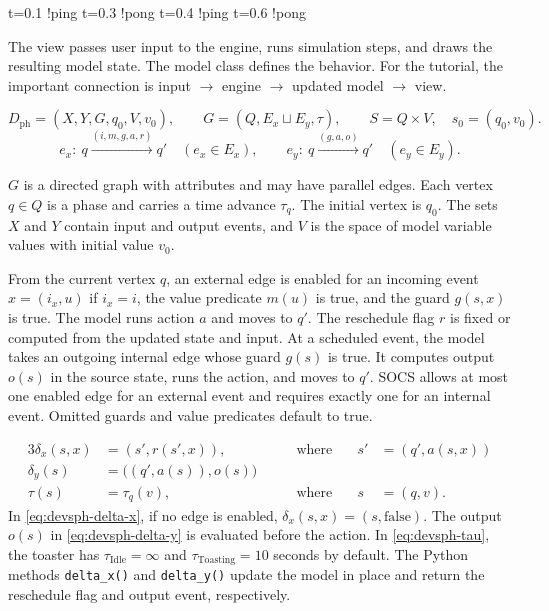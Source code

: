 \documentclass[11pt,a4paper]{article}
\newcommand{\api}[1]{\texttt{#1}}
\newcommand{\chaptermark}[1]{\par\noindent{\LARGE\color{ink}\bfseries #1}\par\smallskip}
\newcommand{\topic}[1]{\par\medskip{\large\color{accent}\bfseries #1}\par}
\begin{document}
\begin{Code}
t=0.1  !ping
t=0.3  !pong
t=0.4  !ping
t=0.6  !pong
\end{Code}
\topic{What the live view does}
The view passes user input to the engine, runs simulation steps, and
draws the resulting model state. The model class defines the behavior.
For the tutorial, the important connection is input $\to$ engine
$\to$ updated model $\to$ view.

\newpage
\chaptermark{2.2 \enspace DEVSph}
\begin{equation}\label{eq:devsph}
D_{\mathrm{ph}}=(X,Y,G,q_0,V,v_0),
\qquad G=(Q,E_x\sqcup E_y,\tau),
\qquad S=Q\times V,\quad s_0=(q_0,v_0).
\end{equation}
\begin{equation}\label{eq:devsph-edges}
e_x:\ q\xrightarrow{(i,m,g,a,r)}q'\quad(e_x\in E_x),
\qquad
e_y:\ q\xrightarrow{(g,a,o)}q'\quad(e_y\in E_y).
\end{equation}

$G$ is a directed graph with attributes and may have parallel edges.
Each vertex $q\in Q$ is a phase and carries a time advance $\tau_q$.
The initial vertex is $q_0$. The sets $X$ and $Y$ contain input and
output events, and $V$ is the space of model variable values with initial
value $v_0$.

From the current vertex $q$, an external edge is enabled for an incoming
event $x=(i_x,u)$ if $i_x=i$, the value predicate $m(u)$ is true, and
the guard $g(s,x)$ is true. The model runs action $a$ and moves to $q'$.
The reschedule flag $r$ is fixed or computed from the updated state and
input. At a scheduled event, the model takes an outgoing internal edge
whose guard $g(s)$ is true. It computes output $o(s)$ in the source
state, runs the action, and moves to $q'$. SOCS allows at most one enabled
edge for an external event and requires exactly one for an internal event.
Omitted guards and value predicates default to true.

\begin{alignat}{3}
\delta_x(s,x) &= (s',r(s',x)), &\qquad\text{where}\quad & s' &= (q',a(s,x))
  \label{eq:devsph-delta-x}\\
\delta_y(s)   &= \bigl((q',a(s)),o(s)\bigr)
  \label{eq:devsph-delta-y}\\
\tau(s)       &= \tau_q(v), &\qquad\text{where}\quad & s &= (q,v).
  \label{eq:devsph-tau}
\end{alignat}
In \eqref{eq:devsph-delta-x}, if no edge is enabled, $\delta_x(s,x)=(s,\mathrm{false})$. The output $o(s)$ in \eqref{eq:devsph-delta-y} is evaluated before the action. In \eqref{eq:devsph-tau}, the toaster has $\tau_{\mathrm{Idle}}=\infty$ and $\tau_{\mathrm{Toasting}}=10$ seconds by default. The Python methods \api{delta\_x()} and \api{delta\_y()} update the model in place and return the reschedule flag and output event, respectively.
\end{document}
